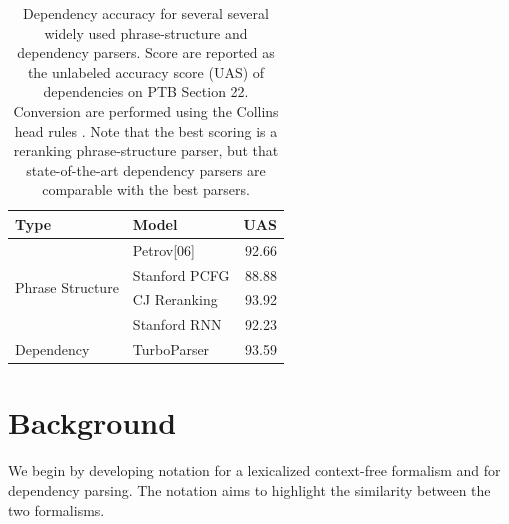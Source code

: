 \documentclass[11pt,letterpaper]{article}
\begin{document}




\begin{table}
  \centering
  \small
  \begin{tabular}{|l|l|r|}
    \hline
    Type & Model & UAS  \\
    \hline

    \hline
    \multirow{4}{*}{Phrase Structure} & Petrov[06] & 92.66   \\
    & Stanford PCFG & 88.88 \\
    & CJ Reranking & 93.92 \\
    & Stanford RNN & 92.23 \\
    \hline
    \multirow{1}{*}{Dependency} & TurboParser & 93.59  \\
    \hline
  \end{tabular}
  \caption{Dependency accuracy for several several widely used phrase-structure and dependency parsers.
    Score are reported as the unlabeled accuracy score (UAS) of dependencies on PTB  Section 22.
    Conversion are performed using the Collins head rules \cite{collins2003head}.
    Note that the best scoring is a reranking phrase-structure parser, but that state-of-the-art
    dependency parsers are comparable with the best parsers. }
  \label{fig:depcomp}
\end{table}





\section{Background}

We begin by developing notation for a lexicalized context-free formalism and for dependency parsing. The notation aims to highlight the similarity between the two formalisms.
\end{document}
